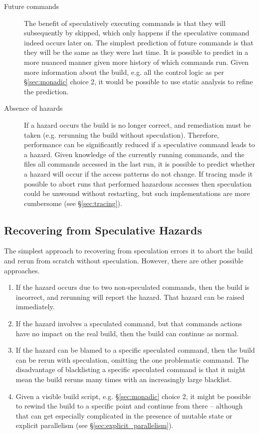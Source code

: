 \begin{description}
\item[Future commands] The benefit of speculatively executing commands is that they will subsequently by skipped, which only happens if the speculative command indeed occurs later on. The simplest prediction of future commands is that they will be the same as they were last time. It is possible to predict in a more nuanced manner given more history of which commands run. Given more information about the build, e.g. all the control logic as per \S\ref{sec:monadic} choice 2, it would be possible to use static analysis to refine the prediction.
\item[Absence of hazards] If a hazard occurs the build is no longer correct, and remediation must be taken (e.g. rerunning the build without speculation). Therefore, performance can be significantly reduced if a speculative command leads to a hazard. Given knowledge of the currently running commands, and the files all commands accessed in the last run, it is possible to predict whether a hazard will occur if the access patterns do not change. If tracing made it possible to abort runs that performed hazardous accesses then speculation could be unwound without restarting, but such implementations are more cumbersome (see \S\ref{sec:tracing}).
\end{description}

\subsection{Recovering from Speculative Hazards}

The simplest approach to recovering from speculation errors it to abort the build and rerun from scratch without speculation. However, there are other possible approaches.

\begin{enumerate}
\item If the hazard occurs due to two non-speculated commands, then the build is incorrect, and rerunning will report the hazard. That hazard can be raised immediately.
\item If the hazard involves a speculated command, but that commands actions have no impact on the real build, then the build can continue as normal.
\item If the hazard can be blamed to a specific speculated command, then the build can be rerun with speculation, omitting the one problematic command. The disadvantage of blacklisting a specific speculated command is that it might mean the build reruns many times with an increasingly large blacklist.
\item Given a visible build script, e.g. \S\ref{sec:monadic} choice 2, it might be possible to rewind the build to a specific point and continue from there -- although that can get especially complicated in the presence of mutable state or explicit parallelism (see \S\ref{sec:explicit_parallelism}).
\end{enumerate}

